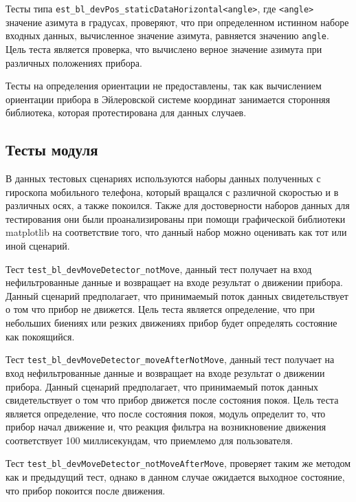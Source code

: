 Тесты типа \lstinline|est_bl_devPos_staticDataHorizontal<angle>|, где \lstinline|<angle>| значение азимута в градусах, проверяют, что при определенном истинном наборе
входных данных, вычисленное значение азимута, равняется значению \lstinline|angle|. Цель теста является проверка, что вычислено верное значение азимута при различных положениях прибора.

Тесты на определения ориентации не предоставлены, так как вычислением ориентации прибора в Эйлеровской системе координат занимается сторонняя библиотека,
которая протестирована для данных случаев.

\subsection{Тесты модуля \moduleMoveDetect}

В данных тестовых сценариях используются наборы данных полученных с гироскопа мобильного телефона, который вращался с различной скоростью и в различных осях, а также покоился.
Также для достоверности наборов данных для тестирования они были проанализированы при помощи графической библиотеки matplotlib на соответствие того, что данный набор можно оценивать
как тот или иной сценарий.

Тест \lstinline|test_bl_devMoveDetector_notMove|, данный тест получает на вход нефильтрованные данные и возвращает на входе результат о движении прибора.
Данный сценарий предполагает, что принимаемый поток данных свидетельствует о том что прибор не движется. Цель теста является определение, что при небольших
биениях или резких движениях прибор будет определять состояние как покоящийся.

Тест \lstinline|test_bl_devMoveDetector_moveAfterNotMove|, данный тест получает на вход нефильтрованные данные и возвращает на входе результат о движении прибора.
Данный сценарий предполагает, что принимаемый поток данных свидетельствует о том что прибор движется после состояния покоя. Цель теста является определение, что
после состояния покоя, модуль определит то, что прибор начал движение и, что реакция фильтра на возникновение движения соответствует 100 миллисекундам, что приемлемо
для пользователя.

Тест \lstinline|test_bl_devMoveDetector_notMoveAfterMove|, проверяет таким же методом как и предыдущий тест, однако в данном
случае ожидается выходное состояние, что прибор покоится после движения.
